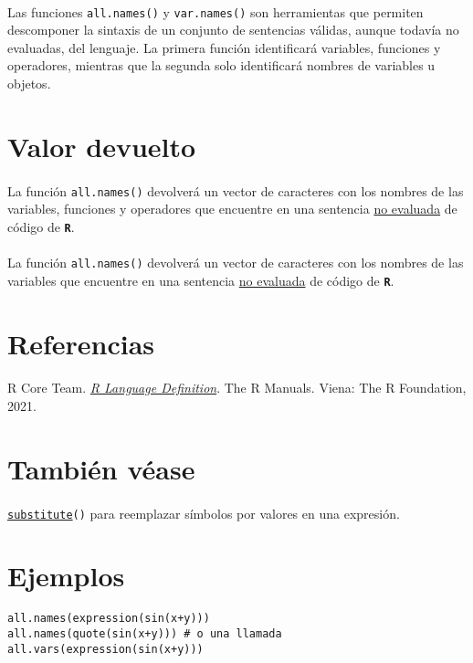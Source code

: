 \documentclass{article}[letter, 12pt]
\newlength\tindent
\renewcommand{\indent}{\hspace*{\tindent}}
\def\code#1{\texttt{#1}}
\def\codename#1{\textbf{\texttt{\color{gray}#1}}}
\begin{document}
\paragraph{}
Las funciones \code{all.names()} y \code{var.names()} son herramientas que permiten descomponer la sintaxis de un conjunto de sentencias válidas, aunque todavía no evaluadas, del lenguaje. La primera función identificará variables, funciones y operadores, mientras que la segunda solo identificará nombres de variables u objetos.\par
\section{\color{gray}Valor devuelto}
\paragraph{}
La función \code{all.names()} devolverá un vector de caracteres con los nombres de las variables, funciones y operadores que encuentre en una sentencia \href{run:/Vocabulary.pdf}{no evaluada} de código de \codename{R}.\par
\paragraph{}
La función \code{all.names()} devolverá un vector de caracteres con los nombres de las variables que encuentre en una sentencia \href{run:/Vocabulary.pdf}{no evaluada} de código de \codename{R}.\par
\section{\color{gray}Referencias}
\paragraph{}
R Core Team. \href{https://cran.r-project.org/doc/manuals/R-lang.html}{\textit{R Language Definition}}. The R Manuals. Viena: The R Foundation, 2021.
\section{\color{gray}También véase}
\paragraph{}
\href{run:/Vocabulary.pdf}{\code{substitute}}\code{()} para reemplazar símbolos por valores en una expresión.
\section{\color{gray}Ejemplos}
\indent\code{all.names(expression(sin(x+y)))} \\
\indent\code{all.names(quote(sin(x+y)))  \# o una llamada} \\
\indent\code{all.vars(expression(sin(x+y)))} \\
\end{document}
